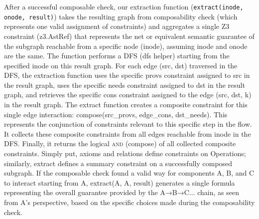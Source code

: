 After a successful composable check, our extraction function
(\texttt{extract(inode, onode, result)}) takes the resulting graph
from composability check (which represents one valid assignment of
constraints) and aggregates a single Z3 constraint (z3.AstRef) that
represents the net or equivalent semantic guarantee of the subgraph
reachable from a specific node (inode), assuming inode and onode are
the same. The function performs a DFS (dfs helper) starting from the
specified inode on this result graph. For each edge (src, dst)
traversed in the DFS, the extraction function uses the specific provs
constraint assigned to src in the result graph, uses the specific
needs constraint assigned to dst in the result graph, and retrieves
the specific cons constraint assigned to the edge (src, dst, k) in
the result graph. The extract function creates a composite constraint
for this single edge interaction: compose(src\_provs, edge\_cons,
dst\_needs). This represents the conjunction of constraints relevant
to this specific step in the flow. It collects these composite
constraints from all edges reachable from inode in the DFS. Finally,
it returns the logical \textsc{and} (compose) of all collected composite
constraints. Simply put, axioms and relations define constraints on
Operations; similarly, extract defines a summary constraint on a
successfully composed subgraph. If the composable check found a valid
way for components A, B, and C to interact starting from A,
extract(A, A, result) generates a single formula representing the
overall guarantee provided by the A→B→C... chain, as seen from A's
perspective, based on the specific choices made during the composability check.


